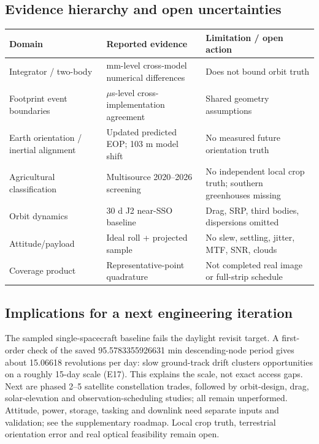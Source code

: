\documentclass[10pt,a4paper]{article}
\begin{document}
\subsection{Evidence hierarchy and open uncertainties}
{\fontsize{9}{12}\selectfont\par{}\begin{minipage}{\linewidth}\captionsetup{hypcap=false}\label{tab:limits}\end{minipage}\par\nobreak
\begin{tabularx}{\linewidth}{@{}XlX@{}}\toprule\rowcolor{headerbg}Domain & Reported evidence & Limitation / open action\\\midrule
Integrator / two-body & mm-level cross-model numerical differences & Does not bound orbit truth\\
\rowcolor{rowalt}Footprint event boundaries & $\mu$s-level cross-implementation agreement & Shared geometry assumptions\\
Earth orientation / inertial alignment & Updated predicted EOP; 103 m model shift & No measured future orientation truth\\
\rowcolor{rowalt}Agricultural classification & Multisource 2020--2026 screening & No independent local crop truth; southern greenhouses missing\\
Orbit dynamics & 30 d J2 near-SSO baseline & Drag, SRP, third bodies, dispersions omitted\\
\rowcolor{rowalt}Attitude/payload & Ideal roll + projected sample & No slew, settling, jitter, MTF, SNR, clouds\\
Coverage product & Representative-point quadrature & Not completed real image or full-strip schedule\\\bottomrule\end{tabularx}}

\subsection{Implications for a next engineering iteration}
The sampled single-spacecraft baseline fails the daylight revisit target. A first-order check of the saved 95.5783355926631 min descending-node period gives about 15.06618 revolutions per day: slow ground-track drift clusters opportunities on a roughly 15-day scale (E17). This explains the scale, not exact access gaps. Next are phased 2--5 satellite constellation trades, followed by orbit-design, drag, solar-elevation and observation-scheduling studies; all remain unperformed. Attitude, power, storage, tasking and downlink need separate inputs and validation; see the supplementary roadmap. Local crop truth, terrestrial orientation error and real optical feasibility remain open.
\end{document}
